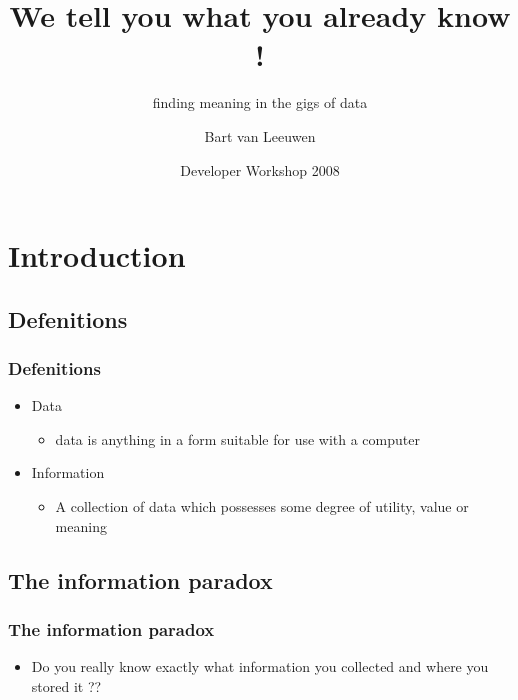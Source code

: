 \documentclass{beamer}
\title{We tell you what you already know !}
\subtitle{finding meaning in the gigs of data}
\author{Bart van Leeuwen}
\date{Developer Workshop 2008}
\begin{document}
\begin{frame}
\titlepage
\end{frame}



\section{Introduction}

\subsection[Defenitions]{Defenitions}

\begin{frame}
\frametitle{Defenitions}

\begin{itemize}
  \item Data
  \begin{itemize}
  	\item data is anything in a form suitable for use with a computer
  \end{itemize}
  \item Information
  \begin{itemize}
  	\item A collection of data which possesses some degree of utility,
  	value or meaning
  \end{itemize}
\end{itemize}
\end{frame}

\subsection[Current state]{The information paradox}

\begin{frame}
\frametitle{The information paradox}
\begin{itemize}
  \item Do you really know exactly what information you collected and where you
  stored it ??
\end{itemize}
\end{frame}
\end{document}
